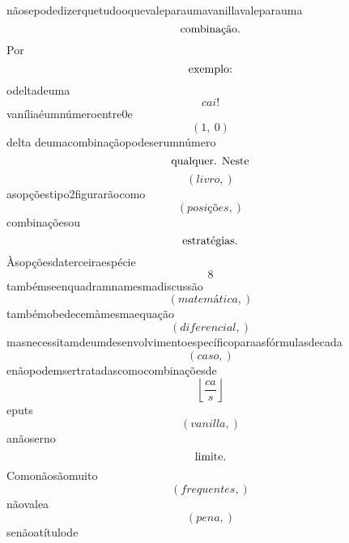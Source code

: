 \documentclass{article}
\begin{document}
\begin{equation}
\end{equation}nãosepodedizerquetudooquevaleparaumavanillavaleparauma\begin{equation}
$combinação.$
\end{equation}Por\begin{equation}
$exemplo:$
\end{equation}odeltadeuma\begin{equation}
cai!
\end{equation}vaníliaéumnúmeroentre0e\begin{equation}
\left( 1, \  0\right)
\end{equation}delta deumacombinaçãopodeserumnúmero\begin{equation}
$qualquer. Neste$
\end{equation}\begin{equation}
\left( livro,\right)
\end{equation}asopçõestipo2figurarãocomo\begin{equation}
\left( posições,\right)
\end{equation}combinaçõesou\begin{equation}
$estratégias.$
\end{equation}Àsopçõesdaterceiraespécie\begin{equation}
8
\end{equation}tambémseenquadramnamesmadiscussão\begin{equation}
\left( matemática,\right)
\end{equation}tambémobedecemàmesmaequação\begin{equation}
\left( diferencial,\right)
\end{equation}masnecessitamdeumdesenvolvimentoespecíficoparaasfórmulasdecada\begin{equation}
\left( caso,\right)
\end{equation}enãopodemsertratadascomocombinaçõesde\begin{equation}
\left\lfloor{\frac{ca}{s}}\right\rfloor
\end{equation}eputs\begin{equation}
\left( vanilla,\right)
\end{equation}anãoserno\begin{equation}
$limite.$
\end{equation}Comonãosãomuito\begin{equation}
\left( frequentes,\right)
\end{equation}nãovalea\begin{equation}
\left( pena,\right)
\end{equation}senãoatítulode\begin{equation}

\end{equation}
\end{document}
